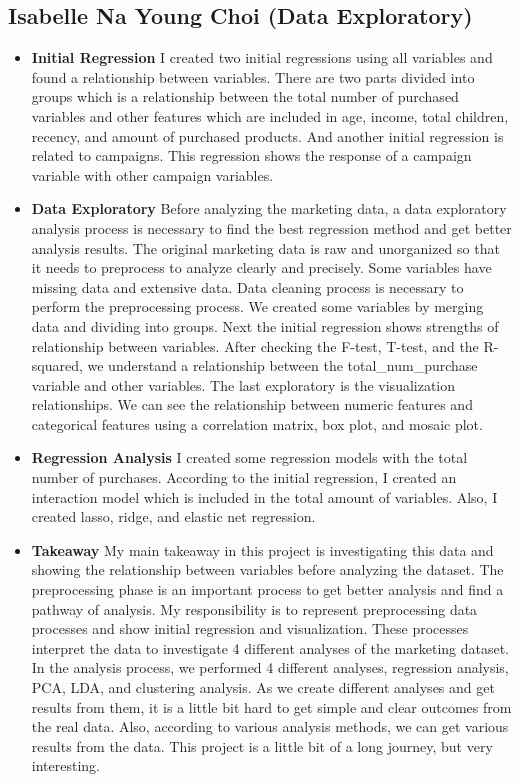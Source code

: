 \documentclass[11pt]{article} %
\begin{document}
\subsection{Isabelle Na Young Choi (Data Exploratory)}
\begin{itemize}
\item \textbf{Initial Regression}
\newline
I created two initial regressions using all variables and found a relationship between variables. There are two parts divided into groups which is a relationship between the total number of purchased variables and other features which are included in age, income, total children, recency, and amount of purchased products. And another initial regression is related to campaigns. This regression shows the response of a campaign variable with other campaign variables.
\item \textbf{Data Exploratory}
\newline
Before analyzing the marketing data, a data exploratory analysis process is necessary to find the best regression method and get better analysis results. The original marketing data is raw and unorganized so that it needs to preprocess to analyze clearly and precisely. Some variables have missing data and extensive data. Data cleaning process is necessary to perform the preprocessing process. We created some variables by merging data and dividing into groups. Next the initial regression shows strengths of relationship between variables. After checking the F-test, T-test, and the R-squared, we understand a relationship between the total\_num\_purchase variable and other variables. The last exploratory is the visualization relationships. We can see the relationship between numeric features and categorical features using a correlation matrix, box plot, and mosaic plot.
\item \textbf{Regression Analysis}
\newline
I created some regression models with the total number of purchases. According to the initial regression, I created an interaction model which is included in the total amount of variables. Also, I created lasso, ridge, and elastic net regression.
\item \textbf{Takeaway}
\newline
My main takeaway in this project is investigating this data and showing the relationship between variables before analyzing the dataset. The preprocessing phase is an important process to get better analysis and find a pathway of analysis. My responsibility is to represent preprocessing data processes and show initial regression and visualization. These processes interpret the data to investigate 4 different analyses of the marketing dataset. In the analysis process, we performed 4 different analyses, regression analysis, PCA, LDA, and clustering analysis. As we create different analyses and get results from them, it is a little bit hard to get simple and clear outcomes from the real data. Also, according to various analysis methods, we can get various results from the data. This project is a little bit of a long journey, but very interesting. 
\end{itemize}
\end{document}
